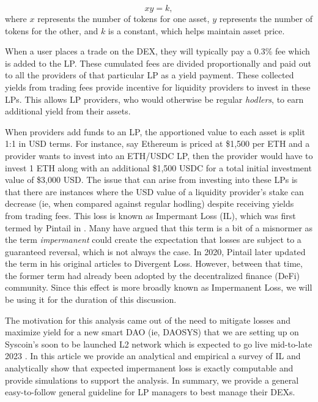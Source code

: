 \documentclass[journal,twocolumn,12pt]{ieeesyscoin}
\begin{document}
\begin{equation}\label{eqn:cpt}
xy = k,
\end{equation}
where $x$ represents the number of tokens for one asset, $y$ represents the number of tokens for the other, and $k$ is a constant, which helps maintain asset price.

When a user places a trade on the DEX, they will typically pay a 0.3\% fee which is added to the LP. These cumulated fees are divided proportionally and paid out to all the providers of that particular LP as a yield payment. These collected yields from trading fees provide incentive for liquidity providers to invest in these LPs. This allows LP providers, who would otherwise be regular \textit{hodlers}, to earn additional yield from their assets.

When providers add funds to an LP, the apportioned value to each asset is split 1:1 in USD terms. For instance, say Ethereum is priced at \$1,500 per ETH and a provider wants to invest into an ETH/USDC LP, then the provider would have to invest 1 ETH along with an additional \$1,500 USDC for a total initial investment value of \$3,000 USD. The issue that can arise from investing into these LPs is that there are instances where the USD value of a liquidity provider's stake can decrease (ie, when compared against regular hodling) despite receiving yields from trading fees. This loss is known as Impermant Loss (IL), which was first termed by Pintail in \cite{Pin19a, Pin19b}. Many have argued that this term is a bit of a misnormer as the term \textit{impermanent} could create the expectation that losses are subject to a guaranteed reversal, which is not always the case. In 2020, Pintail later updated the term in his original articles to Divergent Loss. However, between that time, the former term had already been adopted by the decentralized finance (DeFi) community. Since this effect is more broadly known as Impermanent Loss, we will be using it for the duration of this discussion.

The motivation for this analysis came out of the need to mitigate losses and maximize yield for a new smart DAO (ie, DAOSYS) that we are setting up on Syscoin's soon to be launched L2 network which is expected to go live mid-to-late 2023 \cite{Doge22}. In this article we provide an analytical and empirical a survey of IL and analytically show that expected impermanent loss is exactly computable and provide simulations to support the analysis. In summary, we provide a general easy-to-follow general guideline for LP managers to best manage their DEXs.
\end{document}
